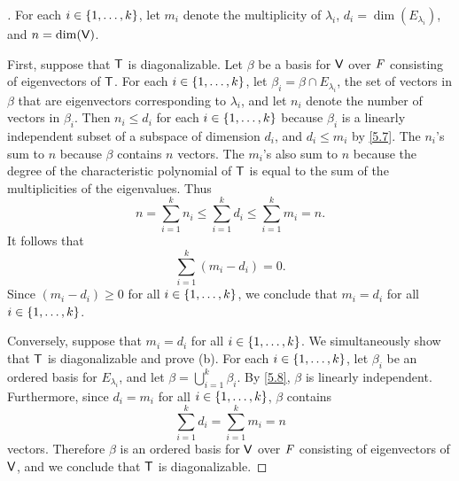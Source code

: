 \begin{proof}[]
  For each \(i \in \left\lbrace1, \dots, k\right\rbrace\), let \(m_i\) denote the multiplicity of \(\lambda_i\), \(d_i = \dim(E_{\lambda_i})\), and \(n = \dim(\mathsf{V})\).

  First, suppose that \(\mathsf{T}\) is diagonalizable.
  Let \(\beta\) be a basis for \(\mathsf{V}\) over \(\mathit{F}\) consisting of eigenvectors of \(\mathsf{T}\).
  For each \(i \in \left\lbrace1, \dots, k\right\rbrace\), let \(\beta_i = \beta \cap E_{\lambda_i}\), the set of vectors in \(\beta\) that are eigenvectors corresponding to \(\lambda_i\), and let \(n_i\) denote the number of vectors in \(\beta_i\).
  Then \(n_i \leq d_i\) for each \(i \in \left\lbrace1, \dots, k\right\rbrace\) because \(\beta_i\) is a linearly independent subset of a subspace of dimension \(d_i\), and \(d_i \leq m_i\) by \cref{5.7}.
  The \(n_i\)'s sum to \(n\) because \(\beta\) contains \(n\) vectors.
  The \(m_i\)'s also sum to \(n\) because the degree of the characteristic polynomial of \(\mathsf{T}\) is equal to the sum of the multiplicities of the eigenvalues.
  Thus
  \[
    n = \sum_{i = 1}^k n_i \leq \sum_{i = 1}^k d_i \leq \sum_{i = 1}^k m_i = n.
  \]
  It follows that
  \[
    \sum_{i = 1}^k (m_i - d_i) = 0.
  \]
  Since \((m_i - d_i) \geq 0\) for all \(i \in \left\lbrace1, \dots, k\right\rbrace\), we conclude that \(m_i = d_i\) for all \(i \in \left\lbrace1, \dots, k\right\rbrace\).

  Conversely, suppose that \(m_i = d_i\) for all \(i \in \left\lbrace1, \dots, k\right\rbrace\).
  We simultaneously show that \(\mathsf{T}\) is diagonalizable and prove (b).
  For each \(i \in \left\lbrace1, \dots, k\right\rbrace\), let \(\beta_i\) be an ordered basis for \(E_{\lambda_i}\), and let \(\beta = \bigcup_{i = 1}^k \beta_i\).
  By \cref{5.8}, \(\beta\) is linearly independent.
  Furthermore, since \(d_i = m_i\) for all \(i \in \left\lbrace1, \dots, k\right\rbrace\), \(\beta\) contains
  \[
    \sum_{i = 1}^k d_i = \sum_{i = 1}^k m_i = n
  \]
  vectors.
  Therefore \(\beta\) is an ordered basis for \(\mathsf{V}\) over \(\mathit{F}\) consisting of eigenvectors of \(\mathsf{V}\), and we conclude that \(\mathsf{T}\) is diagonalizable.
\end{proof}

